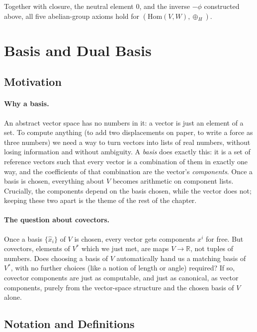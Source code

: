\documentclass[11pt]{article}
\newcommand{\dual}{V^{*}}
\begin{document}
Together with closure, the neutral element $0$, and the inverse $-\phi$ constructed above, all five abelian-group axioms hold for $(\mathrm{Hom}(V,W),\oplus_H)$.

\section{Basis and Dual Basis}

\subsection*{Motivation}

\paragraph{Why a basis.}
An abstract vector space has no numbers in it: a vector is just an element of a set. To compute anything (to add two displacements on paper, to write a force as three numbers) we need a way to turn vectors into lists of real numbers, without losing information and without ambiguity. A \emph{basis} does exactly this: it is a set of reference vectors such that every vector is a combination of them in exactly one way, and the coefficients of that combination are the vector's \emph{components}. Once a basis is chosen, everything about $V$ becomes arithmetic on component lists. Crucially, the components depend on the basis chosen, while the vector does not; keeping these two apart is the theme of the rest of the chapter.

\paragraph{The question about covectors.}
Once a basis $\{\hat x_i\}$ of $V$ is chosen, every vector gets components $x^i$ for free. But covectors, elements of $\dual$ which we just met, are maps $V\to\mathbb R$, not tuples of numbers. Does choosing a basis of $V$ automatically hand us a matching basis of $\dual$, with no further choices (like a notion of length or angle) required? If so, covector components are just as computable, and just as canonical, as vector components, purely from the vector-space structure and the chosen basis of $V$ alone.

\subsection*{Notation and Definitions}
\end{document}
